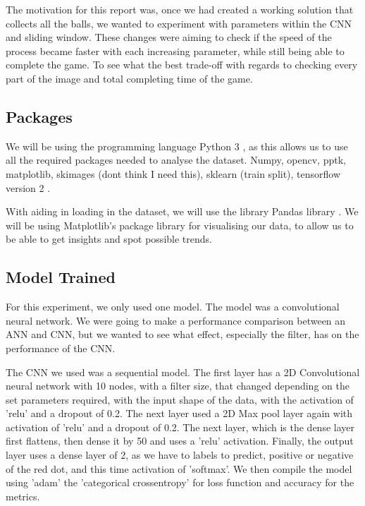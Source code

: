 \documentclass[a4paper,10pt]{article}
\begin{document}
The motivation for this report was, once we had created a working solution that collects all the balls, we wanted to experiment with parameters within the CNN and sliding window. These changes were aiming to check if the speed of the process became faster with each increasing parameter, while still being able to complete the game. To see what the best trade-off with regards to checking every part of the image and total completing time of the game.

\subsection{Packages}


We will be using the programming language Python 3 \cite{Python}, as this allows us to use all the required packages needed to analyse the dataset. Numpy, opencv, pptk, matplotlib, skimages (dont think I need this), sklearn (train split), tensorflow version 2 \cite{tensorflow2015-whitepaper}.

With aiding in loading in the dataset, we will use the library Pandas library \cite{mckinney-proc-scipy-2010}. We will be using Matplotlib's \cite{hunter2007matplotlib} package library for visualising our data, to allow us to be able to get insights and spot possible trends.


\subsection{Model Trained}
For this experiment, we only used one model. The model was a convolutional neural network. We were going to make a performance comparison between an ANN and CNN, but we wanted to see what effect, especially the filter, has on the performance of the CNN. 

The CNN we used was a sequential model. The first layer has a 2D Convolutional neural network with 10 nodes, with a filter size, that changed depending on the set parameters required, with the input shape of the data, with the activation of 'relu' and a dropout of 0.2. The next layer used a 2D Max pool layer again with activation of 'relu' and a dropout of 0.2. The next layer, which is the dense layer first flattens, then dense it by 50 and uses a 'relu' activation. Finally, the output layer uses a dense layer of 2, as we have to labels to predict, positive or negative of the red dot, and this time activation of 'softmax'. We then compile the model using 'adam' the 'categorical crossentropy' for loss function and accuracy for the metrics.
\end{document}
